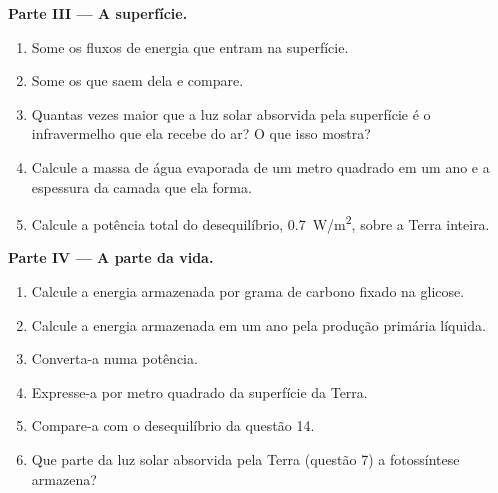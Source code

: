 \begin{problem}
\medskip
\noindent\textbf{Parte III --- A superfície.}
\begin{enumerate}[resume]
  \item Some os fluxos de energia que entram na superfície.
  \item Some os que saem dela e compare.
  \item Quantas vezes maior que a luz solar absorvida pela superfície é o
        infravermelho que ela recebe do ar? O que isso mostra?
  \item Calcule a massa de água evaporada de um metro quadrado em um ano e
        a espessura da camada que ela forma.
  \item Calcule a potência total do desequilíbrio, \qty{0.7}{W/m^2}, sobre
        a Terra inteira.
\end{enumerate}

\medskip
\noindent\textbf{Parte IV --- A parte da vida.}
\begin{enumerate}[resume]
  \item Calcule a energia armazenada por grama de carbono fixado na
        glicose.
  \item Calcule a energia armazenada em um ano pela produção primária
        líquida.
  \item Converta-a numa potência.
  \item Expresse-a por metro quadrado da superfície da Terra.
  \item Compare-a com o desequilíbrio da questão 14.
  \item Que parte da luz solar absorvida pela Terra (questão 7) a
        fotossíntese armazena?
\end{enumerate}
\end{problem}
